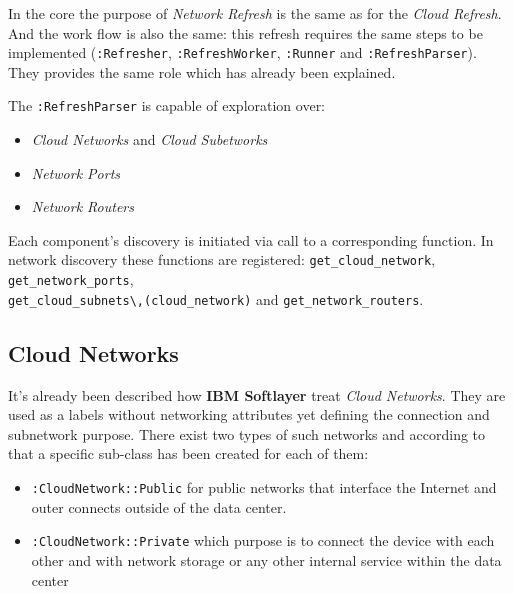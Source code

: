 In the core the purpose of \emph{Network Refresh} is the same as for the \emph{Cloud Refresh}. And the work flow is also the same: this refresh requires the same steps to be implemented (\verb|:Refresher|, \verb|:RefreshWorker|, \verb|:Runner| and \verb|:RefreshParser|). They provides the same role which has already been explained.

The \verb|:RefreshParser| is capable of exploration over:

\begin{itemize}
	\item \emph{Cloud Networks} and \emph{Cloud Subetworks}
	\item \emph{Network Ports}
	\item \emph{Network Routers}
\end{itemize}

Each component's discovery is initiated via call to a corresponding function. In network discovery these functions are registered: \verb|get_cloud_network|, \verb|get_network_ports|, \\ \verb|get_cloud_subnets\,(cloud_network)| and \verb|get_network_routers|.

\subsection{Cloud Networks}
\label{sub:Cloud Networks}

It's already been described how \textbf{IBM Softlayer} treat \emph{Cloud Networks}. They are used as a labels without networking attributes yet defining the connection and subnetwork purpose. There exist two types of such networks and according to that a specific sub-class has been created for each of them:

\begin{itemize}
	\item \verb|:CloudNetwork::Public| for public networks that interface the Internet and outer connects outside of the data center.
	\item \verb|:CloudNetwork::Private| which purpose is to connect the device with each other and with network storage or any other internal service within the data center
\end{itemize}

